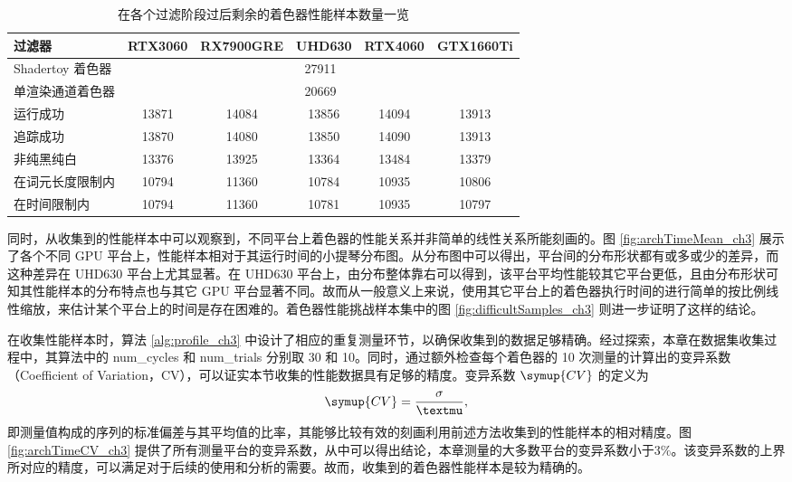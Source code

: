 \begin{table}[h]
      \centering
      \caption{在各个过滤阶段过后剩余的着色器性能样本数量一览}
      \label{table:datasetFilters_ch3}
      \begin{tabular}{l|ccccc}
      \toprule
          \textbf{过滤器}  & RTX3060 & RX7900GRE & UHD630 & RTX4060 & GTX1660Ti \\
      \midrule
          Shadertoy 着色器        & \multicolumn{5}{c}{27911} \\ 
          单渲染通道着色器        & \multicolumn{5}{c}{20669} \\ 
          运行成功           & 13871  & 14084  & 13856 & 14094 & 13913 \\ 
          追踪成功         & 13870  & 14080  & 13850 & 14090 & 13913 \\ 
          非纯黑纯白       & 13376  & 13925  & 13364 & 13484 & 13379 \\ 
          在词元长度限制内 & 10794  & 11360  & 10784 & 10935 & 10806 \\ 
          在时间限制内         & 10794  & 11360  & 10781 & 10935 & 10797 \\
      \bottomrule
      \end{tabular}
\end{table}

{\amend 同时，}从收集到的性能样本中可以观察到，不同平台上着色器的性能关系并非简单的线性关系所能刻画的。图 \ref{fig:archTimeMean_ch3} 展示了各个不同 GPU 平台上，性能样本相对于其运行时间的小提琴分布图。从分布图中可以得出，平台间的分布形状都有或多或少的差异，而这种差异在 UHD630 平台上尤其显著。在 UHD630 平台上，由分布整体靠右可以得到，该平台平均性能较其它平台更低，且由分布形状可知其性能样本的分布特点也与其它 GPU 平台显著不同。故而从一般意义上来说，使用其它平台上的着色器执行时间的进行简单的按比例线性缩放，来估计某个平台上的时间是存在困难的。{\added 着色器性能挑战样本集中的图 \ref{fig:difficultSamples_ch3} 则进一步证明了这样的结论。}

在收集性能样本时，算法 \ref{alg:profile_ch3} 中设计了相应的重复测量环节，以确保收集到的数据足够精确。经过探索，本章在数据集收集过程中，其算法中的 {num\_cycles} 和 {num\_trials} 分别取 30 和 10。{\amend 同时，}通过额外检查每个着色器的 10 次测量的计算出的变异系数（Coefficient of Variation，CV），{\amend 可以证实本节}收集的性能数据具有足够的精度。变异系数 $ \symup{CV} $ 的定义为
$$
\symup{CV} = \frac{\sigma}{\mu},
$$
即测量值构成的序列的标准偏差与其平均值的比率，其能够比较有效的刻画利用前述方法收集到的性能样本的相对精度。图 \ref{fig:archTimeCV_ch3} 提供了所有测量平台的变异系数，从中可以得出结论，本{\amend 章}测量的大多数平台的变异系数小于$3\%$。该变异系数的上界所对应的精度，可以满足对于后续的使用和分析的需要。{\amend 故而，收集到的着色器性能样本是较为精确的。}

